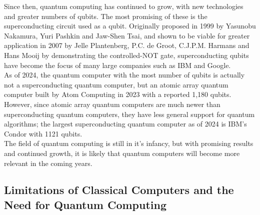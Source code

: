 \documentclass[reqno]{amsart}
\numberwithin{equation}{section}
\numberwithin{figure}{section}
\begin{document}
\begin{justify}
Since then, quantum computing has continued to grow, with new technologies and greater numbers of qubits. The most promising of these is the superconducting circuit used as a qubit. Originally proposed in 1999 by Yasunobu Nakamura, Yuri Pashkin and Jaw-Shen Tsai, \cite{NakamuraPashkinTsai1999} and shown to be viable for greater application in 2007 by Jelle Plantenberg, P.C. de Groot, C.J.P.M. Harmans and Hans Mooij by demonstrating the controlled-NOT gate, \cite{PlantenbergGrootHarmansMooij2007} superconducting qubits have become the focus of many large companies such as IBM and Google. \\

As of 2024, the quantum computer with the most number of qubits is actually not a superconducting quantum computer, but an atomic array quantum computer built by Atom Computing in 2023 \cite{Atom2023, Atom2024} with a reported 1,180 qubits. However, since atomic array quantum computers are much newer than superconducting quantum computers, they have less general support for quantum algorithms; the largest superconducting quantum computer as of 2024 is IBM's Condor with 1121 qubits. \cite{IBM2023, AbuGhanem2024} \\

The field of quantum computing is still in it's infancy, but with promising results and continued growth, it is likely that quantum computers will become more relevant in the coming years.
\end{justify}

\subsection{Limitations of Classical Computers and the Need for Quantum Computing}
\end{document}
